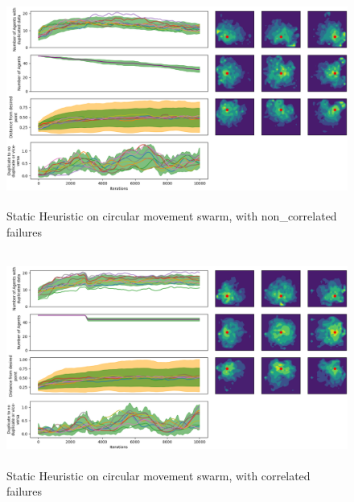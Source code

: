 \documentclass{UoYCSproject}
\begin{document}
\begin{figure}[htb]
\label{fig:circle_movement_non}
\begin{center}
\centering
\includegraphics[height=7cm]{"./Static_Heuristic/circle_movement_non.png"}
\caption{Static Heuristic on circular movement swarm, with non\_correlated failures}
\end{center}
\end{figure}

\begin{figure}[htb]
\label{fig:circle_movement_con}
\begin{center}
\centering
\includegraphics[height=7cm]{"./Static_Heuristic/circle_movement_con.png"}
\caption{Static Heuristic on circular movement swarm, with correlated failures}
\end{center}
\end{figure}
\end{document}
